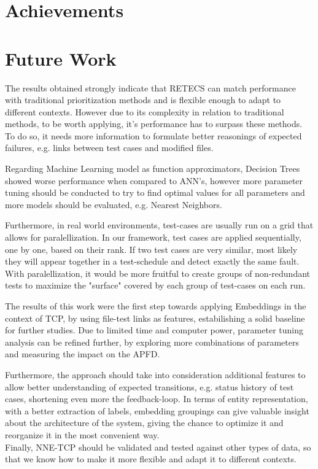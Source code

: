 \section{Achievements}
\label{section:achievements}


\section{Future Work}
\label{section:future}

The results obtained strongly indicate that RETECS can match performance with traditional prioritization methods and is flexible enough to adapt to different contexts. However due to its complexity in relation to traditional methods, to be worth applying, it's performance has to surpass these methods. To do so, it needs more information to formulate better reasonings of expected failures, e.g. links between test cases and modified files. 
\par Regarding Machine Learning model as function approximators, Decision Trees showed worse performance when compared to ANN's, however more parameter tuning should be conducted to try to find optimal values for all parameters and more models should be evaluated, e.g. Nearest Neighbors.
\par Furthermore, in real world environments, test-cases are usually run on a grid that allows for paralellization. In our framework, test cases are applied sequentially, one by one, based on their rank. If two test cases are very similar, most likely they will appear together in a test-schedule and detect exactly the same fault. With paralellization, it would be more fruitful to create groups of non-redundant tests to maximize the "surface" covered by each group of test-cases on each run. 


The results of this work were the first step towards applying Embeddings in the context of TCP, by using file-test links as features, estabilishing a solid baseline for further studies. 
Due to limited time and computer power, parameter tuning analysis can be refined further, by exploring more combinations of parameters and measuring the impact on the APFD.
\par Furthermore, the approach should take into consideration additional features to allow better understanding of expected transitions, e.g. status history of test cases, shortening even more the feedback-loop.
In terms of entity representation, with a better extraction of labels, embedding groupings can give valuable insight about the architecture of the system, giving the chance to optimize it and reorganize it in the most convenient way.
\\

Finally, NNE-TCP should be validated and tested against other types of data, so that we know how to make it more flexible and adapt it to different contexts.

